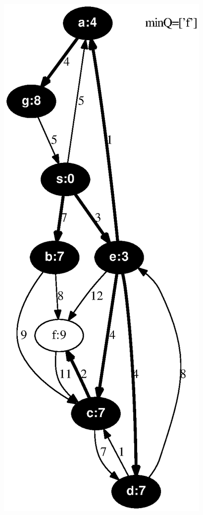 \documentclass{article}
\begin{document}
\includegraphics[height=.3\textheight]{dijkstra_gross_yellen_07.eps}
\vspace{1em}
\end{document}
